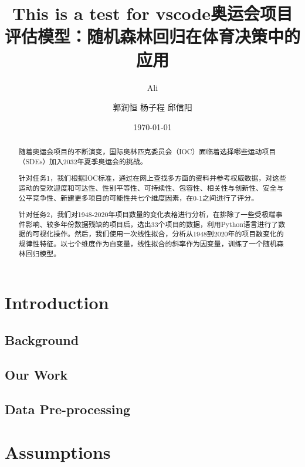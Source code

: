 \documentclass[a4paper]{article}
\title{ This is a test for vscode}
\author{ Ali}
\title{奥运会项目评估模型：随机森林回归在体育决策中的应用}
\author{ 郭润恒 杨子程 邱信阳}
\date{\today}
\begin{document}
    \maketitle


\begin{abstract}
    随着奥运会项目的不断演变，国际奥林匹克委员会（IOC）面临着选择哪些运动项目（SDEs）加入2032年夏季奥运会的挑战。
    \par 针对任务1，我们根据IOC标准，通过在网上查找多方面的资料并参考权威数据，对这些运动的受欢迎度和可达性、性别平等性、可持续性、包容性、相关性与创新性、安全与公平竞争性、新建更多项目的可能性共七个维度因素，在0-1之间进行了评分。
	\par 针对任务2，我们对1948-2020年项目数量的变化表格进行分析，在排除了一些受极端事件影响、较多年份数据残缺的项目后，选出33个项目的数据，利用Python语言进行了数据的可视化操作。然后，我们使用一次线性拟合，分析从1948到2020年的项目数变化的规律性特征。以七个维度作为自变量，线性拟合的斜率作为因变量，训练了一个随机森林回归模型。
\end{abstract}
\tableofcontents
\section{Introduction}
\subsection{Background}     
\subsection{Our Work}
\subsection{Data Pre-processing}


\section{Assumptions}
\end{document}
